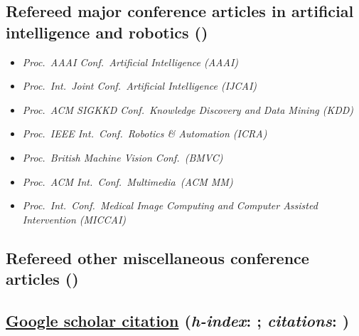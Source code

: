 \documentclass[9pt, a4paper]{article}
\begin{document}
\subsection*{Refereed major conference articles in artificial intelligence and robotics (\unskip)
}
{
\begin{itemize}
  \itemsep -.12cm
\footnotesize
\item \emph{  Proc.\ AAAI Conf.\ Artificial Intelligence (AAAI)}
\item \emph{  Proc.\ Int.\ Joint Conf.\ Artificial Intelligence (IJCAI)}
\item \emph{  Proc.\ ACM SIGKKD Conf.\   Knowledge Discovery and Data Mining (KDD)}
\item \emph{  Proc.\ IEEE Int.\ Conf.\    Robotics \&  Automation (ICRA)}
\item \emph{  Proc.\ British Machine Vision Conf.\ (BMVC)}
\item \emph{  Proc.\ ACM Int.\  Conf.\  Multimedia\ (ACM MM)}
\item \emph{  Proc.\ Int.\ Conf.\ Medical Image Computing and Computer Assisted Intervention (MICCAI)}

\end{itemize}
}




\noindent






\vspace{-0.15cm}
\subsection*{Refereed other miscellaneous  conference articles (\unskip)}
\noindent









\subsection*{\href{https://scholar.google.com/citations?hl=en&user=Ljk2BvIAAAAJ&view_op=list_works}{Google scholar citation} ({\it h-index}:  \unskip; {\it citations}: \unskip) }
\end{document}
